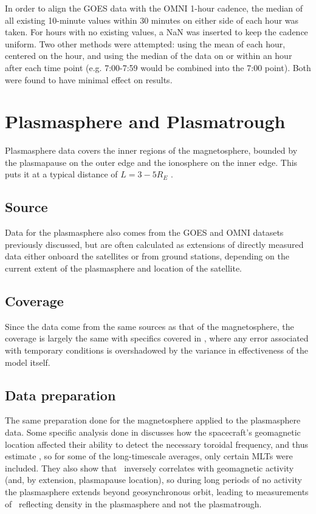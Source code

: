 In order to align the GOES data with the OMNI 1-hour cadence, the median of all existing 10-minute values within 30 minutes on either side of each hour was taken. For hours with no existing values, a NaN was inserted to keep the cadence uniform. Two other methods were attempted: using the mean of each hour, centered on the hour, and using the median of the data on or within an hour after each time point (e.g. 7:00-7:59 would be combined into the 7:00 point). Both were found to have minimal effect on results. 

\section{Plasmasphere and Plasmatrough}
Plasmasphere data covers the inner regions of the magnetosphere, bounded by the plasmapause on the outer edge and the ionosphere on the inner edge. This puts it at a typical distance of $L=3-5R_E$ \citep{Carpenter1992ISEEModel}. 

\subsection{Source}
Data for the plasmasphere also comes from the GOES and OMNI datasets previously discussed, but are often calculated as extensions of directly measured data either onboard the satellites or from ground stations, depending on the current extent of the plasmasphere and location of the satellite.

\subsection{Coverage}
Since the data come from the same sources as that of the magnetosphere, the coverage is largely the same with specifics covered in \cite{Takahashi2010SolarCycleVariation}, where any error associated with temporary conditions is overshadowed by the variance in effectiveness of the model itself. 

\subsection{Data preparation}
The same preparation done for the magnetosphere applied to the plasmasphere data.  Some specific analysis done in \cite{Takahashi2010SolarCycleVariation} discusses how the spacecraft's geomagnetic location affected their ability to detect the necessary toroidal frequency, and thus estimate \req, so for some of the long-timescale averages, only certain MLTs were included. They also show that \req\ inversely correlates with geomagnetic activity (and, by extension, plasmapause location), so during long periods of no activity the plasmasphere extends beyond geosynchronous orbit, leading to measurements of \req\ reflecting density in the plasmasphere and not the plasmatrough. 

